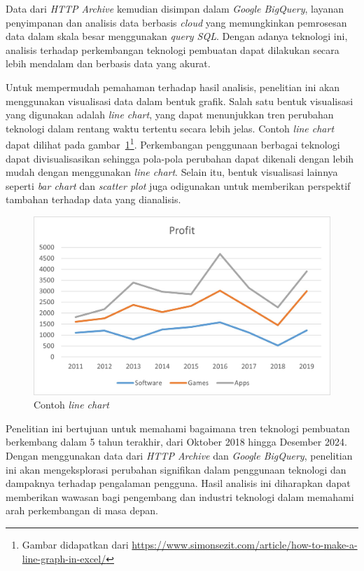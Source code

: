 Data dari \textit{HTTP Archive} kemudian disimpan dalam \textit{Google BigQuery}, layanan penyimpanan dan analisis data berbasis \textit{cloud} yang memungkinkan pemrosesan data dalam skala besar menggunakan \textit{query SQL}. Dengan adanya teknologi ini, analisis terhadap perkembangan teknologi pembuatan \web dapat dilakukan secara lebih mendalam dan berbasis data yang akurat.

Untuk mempermudah pemahaman terhadap hasil analisis, penelitian ini akan menggunakan visualisasi data dalam bentuk grafik. Salah satu bentuk visualisasi yang digunakan adalah \textit{line chart}, yang dapat menunjukkan tren perubahan teknologi dalam rentang waktu tertentu secara lebih jelas. Contoh \textit{line chart} dapat dilihat pada gambar~\ref{fig:contohlinechart}\footnote{Gambar didapatkan dari \url{https://www.simonsezit.com/article/how-to-make-a-line-graph-in-excel/}}. Perkembangan penggunaan berbagai teknologi \web dapat divisualisasikan sehingga pola-pola perubahan dapat dikenali dengan lebih mudah dengan menggunakan \textit{line chart}. Selain itu, bentuk visualisasi lainnya seperti \textit{bar chart} dan \textit{scatter plot} juga odigunakan untuk memberikan perspektif tambahan terhadap data yang dianalisis.

\begin{figure}[]
        \centering
        \includegraphics[width=0.5\linewidth]{Gambar/contoh linechart.jpg}
        \caption{Contoh \textit{line chart}}
        \label{fig:contohlinechart}
    \end{figure}

Penelitian ini bertujuan untuk memahami bagaimana tren teknologi pembuatan \web berkembang dalam 5 tahun terakhir, dari Oktober 2018 hingga Desember 2024. Dengan menggunakan data dari \textit{HTTP Archive} dan \textit{Google BigQuery}, penelitian ini akan mengeksplorasi perubahan signifikan dalam penggunaan teknologi \web dan dampaknya terhadap pengalaman pengguna. Hasil analisis ini diharapkan dapat memberikan wawasan bagi pengembang \web dan industri teknologi dalam memahami arah perkembangan \web di masa depan.
    
